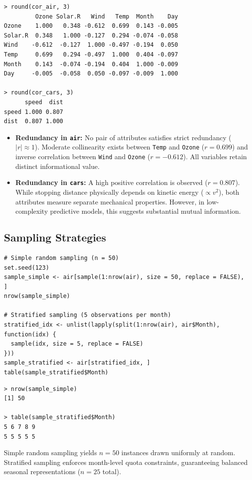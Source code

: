\documentclass[11pt,a4paper]{article}
\begin{document}
\begin{lstlisting}[language={}]
> round(cor_air, 3)
         Ozone Solar.R   Wind   Temp  Month    Day
Ozone    1.000   0.348 -0.612  0.699  0.143 -0.005
Solar.R  0.348   1.000 -0.127  0.294 -0.074 -0.058
Wind    -0.612  -0.127  1.000 -0.497 -0.194  0.050
Temp     0.699   0.294 -0.497  1.000  0.404 -0.097
Month    0.143  -0.074 -0.194  0.404  1.000 -0.009
Day     -0.005  -0.058  0.050 -0.097 -0.009  1.000

> round(cor_cars, 3)
      speed  dist
speed 1.000 0.807
dist  0.807 1.000
\end{lstlisting}
\begin{itemize}
    \item \textbf{Redundancy in \texttt{air}:} No pair of attributes satisfies strict redundancy ($|r| \approx 1$). Moderate collinearity exists between \texttt{Temp} and \texttt{Ozone} ($r = 0.699$) and inverse correlation between \texttt{Wind} and \texttt{Ozone} ($r = -0.612$). All variables retain distinct informational value.
    \item \textbf{Redundancy in \texttt{cars}:} A high positive correlation is observed ($r = 0.807$). While stopping distance physically depends on kinetic energy ($\propto v^2$), both attributes measure separate mechanical properties. However, in low-complexity predictive models, this suggests substantial mutual information.
\end{itemize}

\subsection{Sampling Strategies}
\begin{lstlisting}
# Simple random sampling (n = 50)
set.seed(123)
sample_simple <- air[sample(1:nrow(air), size = 50, replace = FALSE), ]
nrow(sample_simple)

# Stratified sampling (5 observations per month)
stratified_idx <- unlist(lapply(split(1:nrow(air), air$Month), function(idx) {
  sample(idx, size = 5, replace = FALSE)
}))
sample_stratified <- air[stratified_idx, ]
table(sample_stratified$Month)
\end{lstlisting}
\begin{lstlisting}[language={}]
> nrow(sample_simple)
[1] 50

> table(sample_stratified$Month)
5 6 7 8 9 
5 5 5 5 5 
\end{lstlisting}
Simple random sampling yields $n=50$ instances drawn uniformly at random. Stratified sampling enforces month-level quota constraints, guaranteeing balanced seasonal representations ($n=25$ total).
\end{document}
